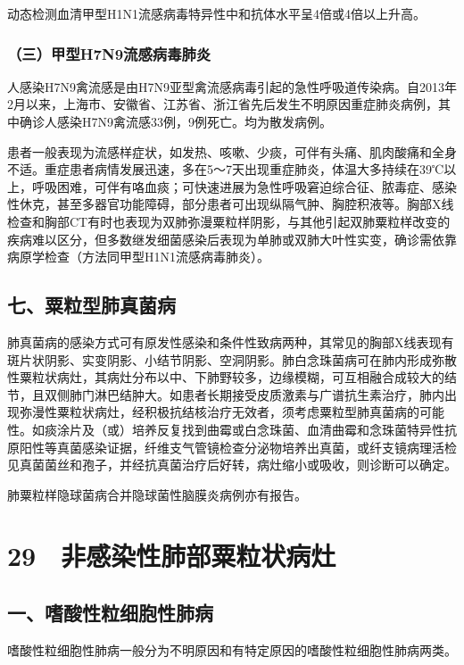 动态检测血清甲型H1N1流感病毒特异性中和抗体水平呈4倍或4倍以上升高。

\subsubsection{（三）甲型H7N9流感病毒肺炎}

人感染H7N9禽流感是由H7N9亚型禽流感病毒引起的急性呼吸道传染病。自2013年2月以来，上海市、安徽省、江苏省、浙江省先后发生不明原因重症肺炎病例，其中确诊人感染H7N9禽流感33例，9例死亡。均为散发病例。

患者一般表现为流感样症状，如发热、咳嗽、少痰，可伴有头痛、肌肉酸痛和全身不适。重症患者病情发展迅速，多在5～7天出现重症肺炎，体温大多持续在39℃以上，呼吸困难，可伴有咯血痰；可快速进展为急性呼吸窘迫综合征、脓毒症、感染性休克，甚至多器官功能障碍，部分患者可出现纵隔气肿、胸腔积液等。胸部X线检查和胸部CT有时也表现为双肺弥漫粟粒样阴影，与其他引起双肺粟粒样改变的疾病难以区分，但多数继发细菌感染后表现为单肺或双肺大叶性实变，确诊需依靠病原学检查（方法同甲型H1N1流感病毒肺炎）。

\subsection{七、粟粒型肺真菌病}

肺真菌病的感染方式可有原发性感染和条件性致病两种，其常见的胸部X线表现有斑片状阴影、实变阴影、小结节阴影、空洞阴影。肺白念珠菌病可在肺内形成弥散性粟粒状病灶，其病灶分布以中、下肺野较多，边缘模糊，可互相融合成较大的结节，且双侧肺门淋巴结肿大。如患者长期接受皮质激素与广谱抗生素治疗，肺内出现弥漫性粟粒状病灶，经积极抗结核治疗无效者，须考虑粟粒型肺真菌病的可能性。如痰涂片及（或）培养反复找到曲霉或白念珠菌、血清曲霉和念珠菌特异性抗原阳性等真菌感染证据，纤维支气管镜检查分泌物培养出真菌，或纤支镜病理活检见真菌菌丝和孢子，并经抗真菌治疗后好转，病灶缩小或吸收，则诊断可以确定。

肺粟粒样隐球菌病合并隐球菌性脑膜炎病例亦有报告。

\protect\hypertarget{text00086.html}{}{}

\section{29　非感染性肺部粟粒状病灶}

\subsection{一、嗜酸性粒细胞性肺病}

嗜酸性粒细胞性肺病一般分为不明原因和有特定原因的嗜酸性粒细胞性肺病两类。

